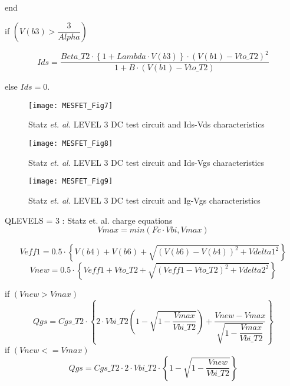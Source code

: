 \hspace{10mm}    end 

\hspace{5mm} if $( V(b3) > \dfrac{3}{Alpha} )$


                \begin{equation}
 		Ids = \dfrac{ Beta\_T2 \cdot \left\lbrace 1+Lambda \cdot V(b3) \right\rbrace \cdot  (V(b1)-Vto\_T2)^{2} } {1+B \cdot (V(b1) - Vto\_T2)} 
		\end{equation} 


else $Ids = 0$.

\begin{figure} 
  \centering
  \texttt{[image: MESFET\_Fig7]} 
  \caption{Statz \textit{et. al.} LEVEL 3 DC test circuit and Ids-Vds characteristics}  
  \label{fig:fig7}
\end{figure} 

\begin{figure} 
  \centering
  \texttt{[image: MESFET\_Fig8]} 
  \caption{Statz \textit{et. al.} LEVEL 3 DC test circuit and Ids-Vgs characteristics} 
  \label{fig:fig8}
\end{figure} 

\begin{figure} 
  \centering
  \texttt{[image: MESFET\_Fig9]} 
  \caption{Statz\textit{ et. al.} LEVEL 3 DC test circuit and Ig-Vgs characteristics} 
  \label{fig:fig9}
\end{figure} 


QLEVELS = 3 : Statz et. al. charge equations
\begin{equation}
 Vmax = min(Fc \cdot Vbi, Vmax)
\end{equation}

\begin{equation}
 Veff1 = 0.5 \cdot \left\lbrace  V(b4)+V(b6)+\sqrt{ (V(b6)-V(b4))^{2} + Vdelta1^{2}  }\right\rbrace 
\end{equation}
\begin{equation}
 Vnew = 0.5 \cdot \left\lbrace Veff1 + Vto\_T2 + \sqrt{(Veff1-Vto\_T2)^{2} + Vdelta2^{2}} \right\rbrace 
\end{equation}

if $(Vnew > Vmax)$
	\begin{equation}
	 Qgs = Cgs\_T2 \cdot \left\lbrace 2 \cdot Vbi\_T2 \left( 1-\sqrt{1-\dfrac{Vmax}{Vbi\_T2}}\right) +\dfrac{Vnew-Vmax}{\sqrt{1-\dfrac{Vmax}{Vbi\_T2}}} \right\rbrace 
	\end{equation}
if $( Vnew <= Vmax )$
	\begin{equation}
	 Qgs = Cgs\_T2 \cdot 2 \cdot Vbi\_T2 \cdot \left\lbrace 1 - \sqrt{1-\dfrac{Vnew}{Vbi\_T2}} \right\rbrace 
	\end{equation}

